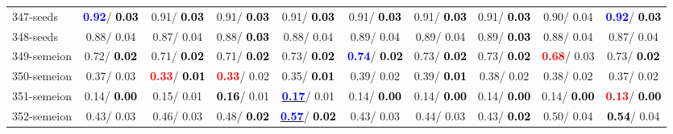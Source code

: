 \begin{table}[h]
\begin{center}
{\begin{tabular}{lc|c|c|c|c|c|c|c|c}
347-seeds & \textcolor{blue}{\textbf{  0.92}}/\textcolor{black}{\textbf{  0.03}} &   0.91/\textcolor{black}{\textbf{  0.03}} &   0.91/\textcolor{black}{\textbf{  0.03}} &   0.91/\textcolor{black}{\textbf{  0.03}} &   0.91/\textcolor{black}{\textbf{  0.03}} &   0.91/\textcolor{black}{\textbf{  0.03}} &   0.91/\textcolor{black}{\textbf{  0.03}} &   0.90/  0.04 & \textcolor{blue}{\textbf{  0.92}}/\textcolor{black}{\textbf{  0.03}} \\
348-seeds &   0.88/  0.04 &   0.87/  0.04 &   0.88/\textcolor{black}{\textbf{  0.03}} &   0.88/  0.04 &   0.89/  0.04 &   0.89/  0.04 &   0.89/\textcolor{black}{\textbf{  0.03}} &   0.88/  0.04 &   0.87/  0.04 \\ \hline
349-semeion &   0.72/\textcolor{black}{\textbf{  0.02}} &   0.71/\textcolor{black}{\textbf{  0.02}} &   0.71/\textcolor{black}{\textbf{  0.02}} &   0.73/\textcolor{black}{\textbf{  0.02}} & \textcolor{blue}{\textbf{  0.74}}/\textcolor{black}{\textbf{  0.02}} &   0.73/\textcolor{black}{\textbf{  0.02}} &   0.73/\textcolor{black}{\textbf{  0.02}} & \textcolor{red}{\textbf{  0.68}}/  0.03 &   0.73/\textcolor{black}{\textbf{  0.02}} \\
350-semeion &   0.37/  0.03 & \textcolor{red}{\textbf{  0.33}}/\textcolor{black}{\textbf{  0.01}} & \textcolor{red}{\textbf{  0.33}}/  0.02 &   0.35/\textcolor{black}{\textbf{  0.01}} &   0.39/  0.02 &   0.39/\textcolor{black}{\textbf{  0.01}} &   0.38/  0.02 &   0.38/  0.02 &   0.37/  0.02 \\
351-semeion &   0.14/\textcolor{black}{\textbf{  0.00}} &   0.15/  0.01 & \textcolor{black}{\textbf{  0.16}}/  0.01 & \underline{\textcolor{blue}{\textbf{  0.17}}}/  0.01 &   0.14/\textcolor{black}{\textbf{  0.00}} &   0.14/\textcolor{black}{\textbf{  0.00}} &   0.14/\textcolor{black}{\textbf{  0.00}} &   0.14/\textcolor{black}{\textbf{  0.00}} & \textcolor{red}{\textbf{  0.13}}/\textcolor{black}{\textbf{  0.00}} \\
352-semeion &   0.43/  0.03 &   0.46/  0.03 &   0.48/\textcolor{black}{\textbf{  0.02}} & \underline{\textcolor{blue}{\textbf{  0.57}}}/\textcolor{black}{\textbf{  0.02}} &   0.43/  0.03 &   0.44/  0.03 &   0.43/\textcolor{black}{\textbf{  0.02}} &   0.50/  0.04 & \textcolor{black}{\textbf{  0.54}}/  0.04 \\\end{tabular}}\label{stratsALCKappa10Allallb}
\end{center}
\end{table}
